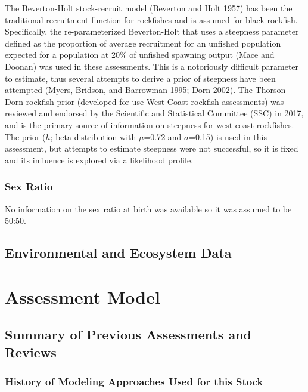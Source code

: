 \documentclass[11pt,
  english,
  letterpaper,
]{article}
\begin{document}
The Beverton-Holt stock-recruit model (Beverton and Holt 1957) has been the traditional recruitment function for rockfishes and is assumed for black rockfish. Specifically, the re-parameterized Beverton-Holt that uses a steepness parameter defined as the proportion of average recruitment for an unfished population expected for a population at 20\% of unfished spawning output (Mace and Doonan) was used in these assessments. This is a notoriously difficult parameter to estimate, thus several attempts to derive a prior of steepness have been attempted (Myers, Bridson, and Barrowman 1995; Dorn 2002). The Thorson-Dorn rockfish prior (developed for use West Coast rockfish assessments) was reviewed and endorsed by the Scientific and Statistical Committee (SSC) in 2017, and is the primary source of information on steepness for west coast rockfishes. The prior (\(h\); beta distribution with \(\mu\)=0.72 and \(\sigma\)=0.15) is used in this assessment, but attempts to estimate steepness were not successful, so it is fixed and its influence is explored via a likelihood profile.

\hypertarget{sex-ratio}{%
\subsubsection{Sex Ratio}\label{sex-ratio}}

No information on the sex ratio at birth was available so it was assumed to be 50:50.

\hypertarget{environmental-and-ecosystem-data}{%
\subsection{Environmental and Ecosystem Data}\label{environmental-and-ecosystem-data}}

\hypertarget{assessment-model}{%
\section{Assessment Model}\label{assessment-model}}

\hypertarget{summary-of-previous-assessments-and-reviews}{%
\subsection{Summary of Previous Assessments and Reviews}\label{summary-of-previous-assessments-and-reviews}}

\hypertarget{history-of-modeling-approaches-used-for-this-stock}{%
\subsubsection{History of Modeling Approaches Used for this Stock}\label{history-of-modeling-approaches-used-for-this-stock}}
\end{document}
